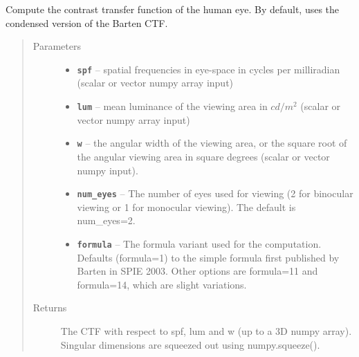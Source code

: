 \documentclass[a4paper,10pt,english]{sphinxmanual}
\begin{document}
\begin{fulllineitems}
\label{packages:optics.ctf_eye}
Compute the contrast transfer function of the human eye.
By default, uses the condensed version of the Barten CTF.
\begin{quote}\begin{description}
\item[{Parameters}] \leavevmode\begin{itemize}
\item {} 
\textbf{\texttt{spf}} -- spatial frequencies in eye-space in cycles per milliradian (scalar or vector numpy array input)

\item {} 
\textbf{\texttt{lum}} -- mean luminance of the viewing area in \(cd/m^2\) (scalar or vector numpy array input)

\item {} 
\textbf{\texttt{w}} -- the angular width of the viewing area, or the square root of the angular viewing area in square degrees
(scalar or vector numpy input).

\item {} 
\textbf{\texttt{num\_eyes}} -- The number of eyes used for viewing (2 for binocular viewing or 1 for monocular viewing). The
default is num\_eyes=2.

\item {} 
\textbf{\texttt{formula}} -- The formula variant used for the computation. Defaults (formula=1) to the simple formula first
published by Barten in SPIE 2003. Other options are formula=11 and formula=14, which are slight variations.

\end{itemize}

\item[{Returns}] \leavevmode
The CTF with respect to spf, lum and w (up to a 3D numpy array). Singular dimensions are squeezed out
using numpy.squeeze().

\end{description}\end{quote}

\end{fulllineitems}

\end{document}
